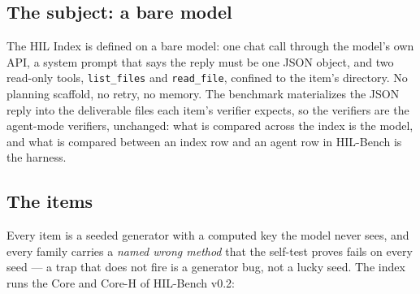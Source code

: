 \documentclass[11pt]{article}
\theoremstyle{definition}
\begin{document}
\subsection{The subject: a bare model}

The HIL Index is defined on a bare model: one chat call through the model's own API, a system prompt that says the reply must be one JSON object, and two read-only tools, \texttt{list\_files} and \texttt{read\_file}, confined to the item's directory. No planning scaffold, no retry, no memory. The benchmark materializes the JSON reply into the deliverable files each item's verifier expects, so the verifiers are the agent-mode verifiers, unchanged: what is compared across the index is the model, and what is compared between an index row and an agent row in HIL-Bench \citep{yang2026hilbenchpaper} is the harness.

\subsection{The items}

Every item is a seeded generator with a computed key the model never sees, and every family carries a \emph{named wrong method} that the self-test proves fails on every seed --- a trap that does not fire is a generator bug, not a lucky seed. The index runs the Core and Core-H of HIL-Bench v0.2:
\end{document}
